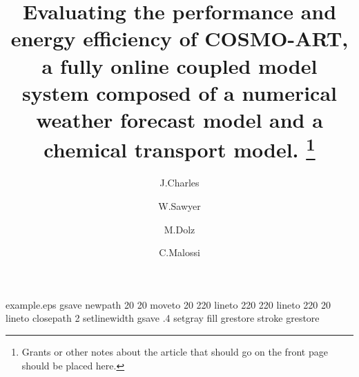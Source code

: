 %
%
%
%
\begin{filecontents*}{example.eps}
gsave
newpath
  20 20 moveto
  20 220 lineto
  220 220 lineto
  220 20 lineto
closepath
2 setlinewidth
gsave
  .4 setgray fill
grestore
stroke
grestore
\end{filecontents*}
%
\RequirePackage{fix-cm}
%
\documentclass[twocolumn]{svjour3}           %
%
\smartqed %
%
\usepackage{graphicx}
\usepackage{hyperref}
\usepackage[round, sort, numbers, authoryear]{natbib}
%
\DeclareRobustCommand\IPCClongname{}
%
%
%


\title{Evaluating the performance  and energy efficiency of COSMO-ART,
  a fully online coupled model  system composed of a numerical weather
  forecast model  and a  chemical transport model.   \thanks{Grants or
    other notes  about the  article that should  go on the  front page
    should be placed here.}}


\author{J.Charles \and W.Sawyer \and M.Dolz \and C.Malossi}


